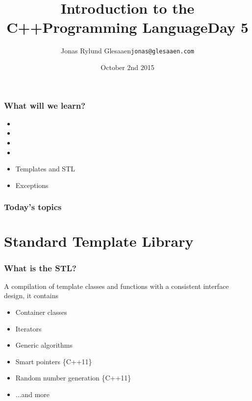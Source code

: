 \documentclass[14pt,a4paper,dvipsnames,usenames]{beamer}
\title[C++ Day5]{Introduction to the C++\newline{}Programming Language\newline{}\newline{}\fontsize{16pt}{16pt}\selectfont{}Day 5}
\author{\texorpdfstring{%
    Jonas Rylund Glesaaen\newline\fontsize{12pt}{12pt}\selectfont\texttt{jonas@glesaaen.com}%
  }{%
    Jonas Rylund Glesaaen}}
\date{October 2nd 2015}
\begin{document}
\begin{frame}
\titlepage
\end{frame}

\begin{frame}
  \frametitle{What will we learn?}

  \begin{itemize}
    \setlength\itemsep{.5em}
    \item {}
    \item {}
    \item {}
    \item {}
    \item Templates and STL 
    \item Exceptions 
  \end{itemize}
\end{frame}

\begin{frame}
  \frametitle{Today's topics}

  \tableofcontents
  
\end{frame}

\section{Standard Template Library}

\frame[plain]{\sectionpage}

\begin{frame}[fragile]
  \frametitle{What is the STL?}

  A compilation of template classes and functions with a consistent interface design, it contains

  \begin{itemize}
    \setlength\itemsep{.4em}
    \item Container classes
    \item Iterators
    \item Generic algorithms
    \item Smart pointers {\footnotesize\color{Tropiteal}\{C++11\}}
    \item Random number generation {\footnotesize\color{Tropiteal}\{C++11\}}
    \item ...and more
  \end{itemize}
  
\end{frame}
\end{document}
